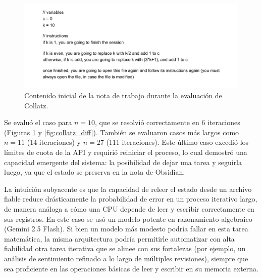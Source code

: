 \begin{figure}[h]
    \centering
    \includegraphics[width=1.0\textwidth]{figures/collatz_init_10.pdf}
    \caption{Contenido inicial de la nota de trabajo durante la evaluación de Collatz.}
    \label{fig:collatz_code}
\end{figure}

Se evaluó el caso para $n=10$, que se resolvió correctamente en 6 iteraciones (Figuras \ref{fig:collatz_code} y \ref{fig:collatz_diff}). También se evaluaron casos más largos como $n=11$ (14 iteraciones) y $n=27$ (111 iteraciones). Este último caso excedió los límites de cuota de la API y requirió reiniciar el proceso, lo cual demostró una capacidad emergente del sistema: la posibilidad de dejar una tarea y seguirla luego, ya que el estado se preserva en la nota de Obsidian.

La intuición subyacente es que la capacidad de releer el estado desde un archivo fiable reduce drásticamente la probabilidad de error en un proceso iterativo largo, de manera análoga a cómo una CPU depende de leer y escribir correctamente en sus registros. En este caso se usó un modelo potente en razonamiento algebraico (Gemini 2.5 Flash). Si bien un modelo más modesto podría fallar en esta tarea matemática, la misma arquitectura podría permitirle automatizar con alta fiabilidad otra tarea iterativa que se alinee con sus fortalezas (por ejemplo, un análisis de sentimiento refinado a lo largo de múltiples revisiones), siempre que sea proficiente en las operaciones básicas de leer y escribir en su memoria externa.


